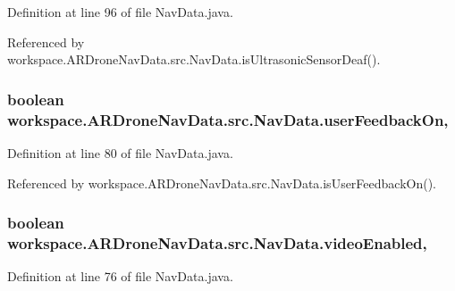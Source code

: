 Definition at line 96 of file Nav\+Data.\+java.



Referenced by workspace.\+A\+R\+Drone\+Nav\+Data.\+src.\+Nav\+Data.\+is\+Ultrasonic\+Sensor\+Deaf().

\hypertarget{classworkspace_1_1_a_r_drone_nav_data_1_1src_1_1_nav_data_addc7665d15f9b60196d060d0457b892d}{}
\subsubsection[{user\+Feedback\+On}]{\setlength{\rightskip}{0pt plus 5cm}boolean workspace.\+A\+R\+Drone\+Nav\+Data.\+src.\+Nav\+Data.\+user\+Feedback\+On\hspace{0.3cm}{\ttfamily [static]}, {\ttfamily [protected]}}\label{classworkspace_1_1_a_r_drone_nav_data_1_1src_1_1_nav_data_addc7665d15f9b60196d060d0457b892d}


Definition at line 80 of file Nav\+Data.\+java.



Referenced by workspace.\+A\+R\+Drone\+Nav\+Data.\+src.\+Nav\+Data.\+is\+User\+Feedback\+On().

\hypertarget{classworkspace_1_1_a_r_drone_nav_data_1_1src_1_1_nav_data_a03af8bd983f45a4b5dc9d3b7eb2f58f6}{}
\subsubsection[{video\+Enabled}]{\setlength{\rightskip}{0pt plus 5cm}boolean workspace.\+A\+R\+Drone\+Nav\+Data.\+src.\+Nav\+Data.\+video\+Enabled\hspace{0.3cm}{\ttfamily [static]}, {\ttfamily [protected]}}\label{classworkspace_1_1_a_r_drone_nav_data_1_1src_1_1_nav_data_a03af8bd983f45a4b5dc9d3b7eb2f58f6}


Definition at line 76 of file Nav\+Data.\+java.



